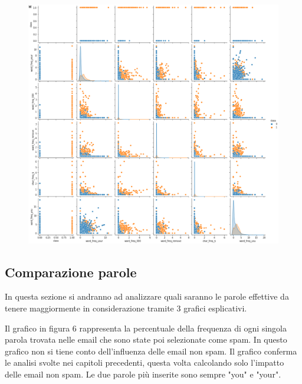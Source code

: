 \documentclass[12pt,a4paper]{article}
\begin{document}
\begin{figure}[H]
    \includegraphics[width=1\columnwidth]{correlation_pair_top_6.png}
    \caption{}
\end{figure}

\subsection{Comparazione parole}
In questa sezione si andranno ad analizzare quali saranno le parole effettive da tenere maggiormente in considerazione tramite 3 grafici esplicativi.


Il grafico in figura 6 rappresenta la percentuale della frequenza di ogni singola parola trovata nelle email che sono state poi selezionate come spam. In questo grafico non si tiene conto dell'influenza delle email non spam. Il grafico conferma le analisi svolte nei capitoli precedenti, questa volta calcolando solo l'impatto delle email non spam. Le due parole più inserite sono sempre "you" e "your".
\end{document}
